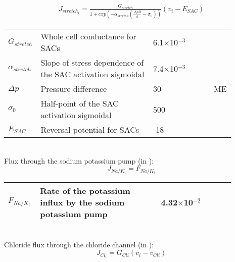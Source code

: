\begin{equation} \label{eq:Jstretchi}
\begin{split}
J_{stretch_{i}}= \frac{G_{stretch}}{1+ exp\left(-\alpha_{stretch}  \left(  \frac{\Delta pR}{h} -\sigma_{0}   \right) \right)}  \left(  v_{i}-E_{SAC}   \right) 
\end{split}
\end{equation}
%
\begin{table}[h!]
\centering
\begin{tabular}{ p{0.09\linewidth}  >{\footnotesize} p{0.5\linewidth}  >{\footnotesize} p{0.27\linewidth} >{\footnotesize} p{0.03\linewidth} }
\hline
$G_{stretch}$      		& Whole cell conductance for SACs						& 6.1$\times$10$^{-3}$ \uMpmVs	&\cite{Koenigsberger2006} \\
$\alpha_{stretch}$      & Slope of stress dependence of the SAC activation sigmoidal	& 7.4$\times$10$^{-3}$ \pmmHg	&\cite{Koenigsberger2006} \\
$ \Delta p $			& Pressure difference										& 30 \mmHg			& ME \\
$\sigma_{0}$      		& Half-point of the SAC activation sigmoidal				& 500 \mmHg			&\cite{Koenigsberger2006} \\
$E_{SAC}$      			& Reversal potential for SACs							& -18 \mV			&\cite{Koenigsberger2006} \\
\hline
\end{tabular}
\label{tab:Jstretchi}
\end{table}
\\
%
Flux through the sodium potassium pump (in \uMs): 
\begin{equation} \label{eq:J_NaK_i}
J_{Na/K_{i}}= F_{Na/K_i}
\end{equation}
%
\begin{table}[h!]
\centering
\begin{tabular}{ p{0.09\linewidth}  >{\footnotesize} p{0.5\linewidth}  >{\footnotesize} p{0.27\linewidth} >{\footnotesize} p{0.03\linewidth} }
\hline
$F_{Na/K_i}$      			& Rate of the potassium influx by the sodium potassium pump 		& 4.32$\times$10$^{-2}$ \uMps 	&\cite{Koenigsberger2006} \\
\hline
\end{tabular}
\label{tab:JCli}
\end{table}
\\
Chloride flux through the chloride channel (in \uMs):
\begin{equation} \label{eq:JCli}
J_{Cl_{i}} = G_{Cli} \left(  v_{i} - v_{Cli}  \right) 
\end{equation}
